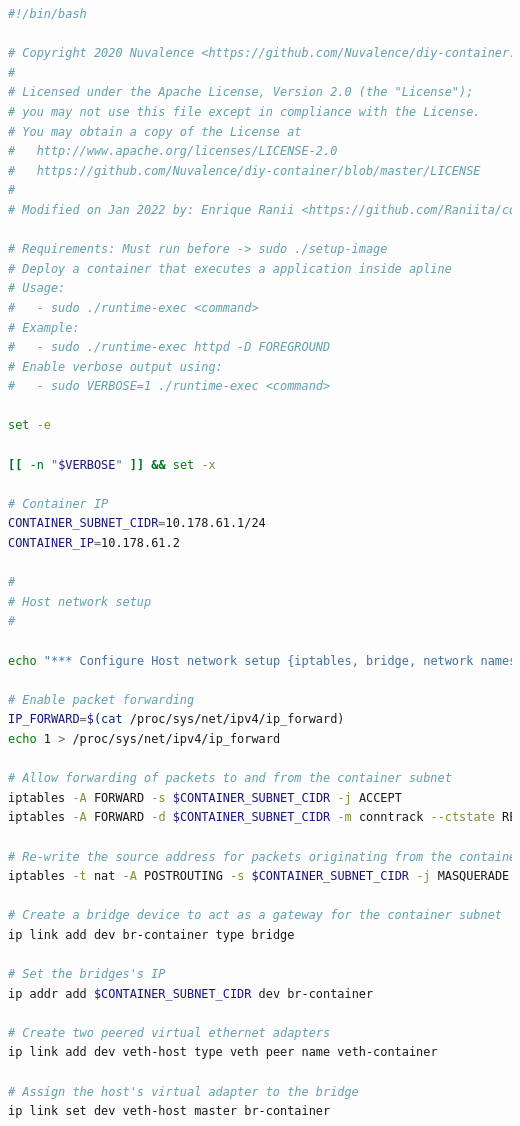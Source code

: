 \documentclass[a4paper, oneside, 12pt]{book}
\begin{document}
	\begin{lstlisting}[language=bash,caption={Ejecución de runtime basado en imagen de Alpine}]
#!/bin/bash

# Copyright 2020 Nuvalence <https://github.com/Nuvalence/diy-container.git>
# 
# Licensed under the Apache License, Version 2.0 (the "License");
# you may not use this file except in compliance with the License.
# You may obtain a copy of the License at
#   http://www.apache.org/licenses/LICENSE-2.0
#   https://github.com/Nuvalence/diy-container/blob/master/LICENSE
#
# Modified on Jan 2022 by: Enrique Ranii <https://github.com/Raniita/container-alpine.git>

# Requirements: Must run before -> sudo ./setup-image
# Deploy a container that executes a application inside apline
# Usage:
#   - sudo ./runtime-exec <command>
# Example:
#   - sudo ./runtime-exec httpd -D FOREGROUND
# Enable verbose output using:
#   - sudo VERBOSE=1 ./runtime-exec <command>

set -e

[[ -n "$VERBOSE" ]] && set -x

# Container IP
CONTAINER_SUBNET_CIDR=10.178.61.1/24
CONTAINER_IP=10.178.61.2

#
# Host network setup
#

echo "*** Configure Host network setup {iptables, bridge, network namespace}..."

# Enable packet forwarding
IP_FORWARD=$(cat /proc/sys/net/ipv4/ip_forward)
echo 1 > /proc/sys/net/ipv4/ip_forward

# Allow forwarding of packets to and from the container subnet
iptables -A FORWARD -s $CONTAINER_SUBNET_CIDR -j ACCEPT
iptables -A FORWARD -d $CONTAINER_SUBNET_CIDR -m conntrack --ctstate RELATED,ESTABLISHED -j ACCEPT

# Re-write the source address for packets originating from the container subnet
iptables -t nat -A POSTROUTING -s $CONTAINER_SUBNET_CIDR -j MASQUERADE

# Create a bridge device to act as a gateway for the container subnet
ip link add dev br-container type bridge

# Set the bridges's IP
ip addr add $CONTAINER_SUBNET_CIDR dev br-container

# Create two peered virtual ethernet adapters
ip link add dev veth-host type veth peer name veth-container

# Assign the host's virtual adapter to the bridge
ip link set dev veth-host master br-container


\end{lstlisting}
\end{document}
